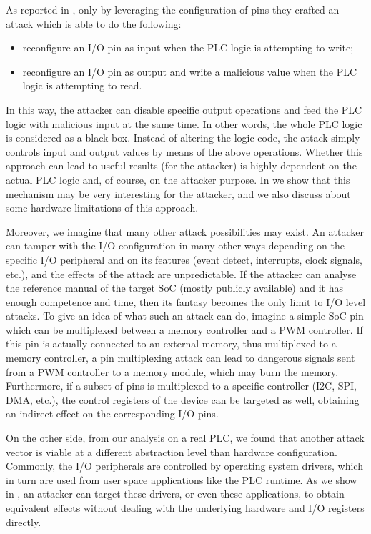 As reported in \cite{ghostplc}, only by leveraging the configuration of pins they crafted an attack which is able to do the following:
\begin{itemize}
	\item reconfigure an I/O pin as input when the PLC logic is attempting to write;
	\item reconfigure an I/O pin as output and write a malicious value when the PLC logic is attempting to read.
\end{itemize}
In this way, the attacker can disable specific output operations and feed the PLC logic with malicious input at the same time.
In other words, the whole PLC logic is considered as a black box. Instead of altering the logic code, the attack simply controls input and output values
by means of the above operations. Whether this approach can lead to useful results (for the attacker) is highly dependent on the actual PLC logic and, of course,
on the attacker purpose. In  we show that this mechanism may be very interesting for the attacker, and we also discuss
about some hardware limitations of this approach.

Moreover, we imagine that many other attack possibilities may exist. An attacker can tamper with the I/O configuration in many other ways depending on the
specific I/O peripheral and on its features (\eg event detect, interrupts, clock signals, etc.), and the effects of the attack are unpredictable.
If the attacker can analyse the reference manual of the target SoC (mostly publicly available) and it has enough competence and time,
then its fantasy becomes the only limit to I/O level attacks.
To give an idea of what such an attack can do, imagine a simple SoC pin which can be multiplexed between a memory controller and a PWM controller.
If this pin is actually connected to an external memory, thus multiplexed to a memory controller, a pin multiplexing attack can lead to dangerous signals
sent from a PWM controller to a memory module, which may burn the memory. Furthermore, if a subset of pins is multiplexed to a specific controller (\eg I2C, SPI, DMA, etc.),
the control registers of the device can be targeted as well, obtaining an indirect effect on the corresponding I/O pins.

On the other side, from our analysis on a real PLC, we found that another attack vector is viable at a different abstraction level than hardware configuration.
Commonly, the I/O peripherals are controlled by operating system drivers, which in turn are used from user space applications like the PLC runtime.
As we show in , an attacker can target these drivers, or even these applications, to obtain equivalent effects without dealing with
the underlying hardware and I/O registers directly.


